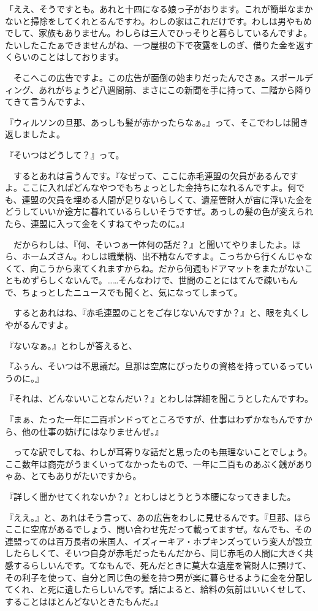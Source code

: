 \documentclass[tate,paper=b6j,jafontsize=9pt]{jlreq}
\begin{document}
「ええ、そうですとも。あれと十四になる娘っ子がおります。これが簡単なまかないと掃除をしてくれとるんですわ。わしの家はこれだけです。わしは男やもめでして、家族もありません。わしらは三人でひっそりと暮らしているんですよ。たいしたこたぁできませんがね、一つ屋根の下で夜露をしのぎ、借りた金を返すくらいのことはしております。

　そこへこの広告ですよ。この広告が面倒の始まりだったんでさぁ。スポールディング、あれがちょうど八週間前、まさにこの新聞を手に持って、二階から降りてきて言うんですよ、

『ウィルソンの旦那、あっしも髪が赤かったらなぁ。』って、そこでわしは聞き返しましたよ。


『そいつはどうして？』って。

　するとあれは言うんです。『なぜって、ここに赤毛連盟の欠員があるんですよ。ここに入ればどんなやつでもちょっとした金持ちになれるんですよ。何でも、連盟の欠員を埋める人間が足りないらしくて、遺産管財人が宙に浮いた金をどうしていいか途方に暮れているらしいそうですぜ。あっしの髪の色が変えられたら、連盟に入って金をくすねてやったのに。』

　だからわしは、『何、そいつぁ一体何の話だ？』と聞いてやりましたよ。ほら、ホームズさん。わしは職業柄、出不精なんですよ。こっちから行くんじゃなくて、向こうから来てくれますからね。だから何週もドアマットをまたがないこともめずらしくないんで。……そんなわけで、世間のことにはてんで疎いもんで、ちょっとしたニュースでも聞くと、気になってしまって。

　するとあれはね、『赤毛連盟のことをご存じないんですか？』と、眼を丸くしやがるんですよ。

『ないなぁ。』とわしが答えると、

『ふぅん、そいつは不思議だ。旦那は空席にぴったりの資格を持っているっていうのに。』

『それは、どんないいことなんだい？』とわしは詳細を聞こうとしたんですわ。

『まぁ、たった一年に二百ポンドってところですが、仕事はわずかなもんですから、他の仕事の妨げにはなりませんぜ。』

　ってな訳でしてね、わしが耳寄りな話だと思ったのも無理ないことでしょう。ここ数年は商売がうまくいってなかったもので、一年に二百ものあぶく銭がありゃあ、とてもありがたいですから。

『詳しく聞かせてくれないか？』とわしはとうとう本腰になってきました。

『ええ。』と、あれはそう言って、あの広告をわしに見せるんです。『旦那、ほらここに空席があるでしょう、問い合わせ先だって載ってますぜ。なんでも、その連盟ってのは百万長者の米国人、イズィーキア・ホプキンズっていう変人が設立したらしくて、そいつ自身が赤毛だったもんだから、同じ赤毛の人間に大きく共感するらしいんです。てなもんで、死んだときに莫大な遺産を管財人に預けて、その利子を使って、自分と同じ色の髪を持つ男が楽に暮らせるように金を分配してくれ、と死に遺したらしいんです。話によると、給料の気前はいいくせして、することはほとんどないときたもんだ。』
\end{document}
